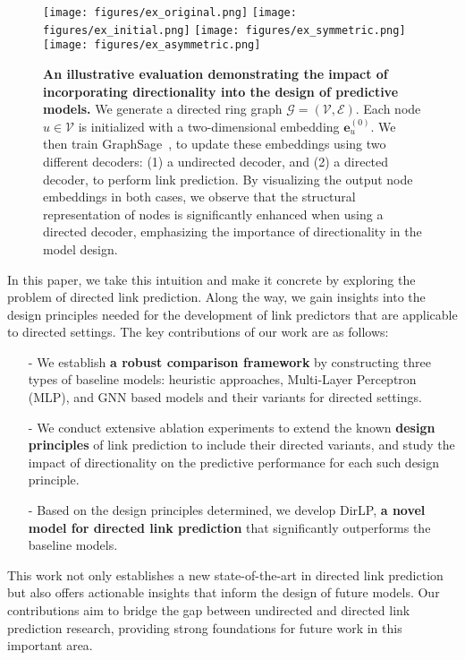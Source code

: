 \documentclass{article}
\begin{document}
\begin{figure}[t]
    \centering
    \texttt{[image: figures/ex\_original.png]} 
    \texttt{[image: figures/ex\_initial.png]}
    \texttt{[image: figures/ex\_symmetric.png]}
    \texttt{[image: figures/ex\_asymmetric.png]}
    \caption{
    \textbf{An illustrative evaluation demonstrating the impact of incorporating directionality into the design of predictive models.} We generate a directed ring graph $\mathcal{G} = (\mathcal{V}, \mathcal{E})$. Each node $u \in \mathcal{V}$ is initialized with a two-dimensional embedding $\mathbf{e}_u^{(0)}$. We then train GraphSage~\citep{hamilton2017inductive}, to update these embeddings using two different decoders: (1) a undirected decoder, and (2) a directed decoder, to perform link prediction. By visualizing the output node embeddings in both cases, we observe that the structural representation of nodes is significantly enhanced when using a directed decoder, emphasizing the importance of directionality in the model design.
    }
    \label{fig:toy_example}
\end{figure}


In this paper, we take this intuition and make it concrete by exploring the problem of directed link prediction. Along the way, we gain insights into the design principles needed for the development of link predictors that are applicable to directed settings. The key contributions of our work are as follows:
\begin{itemize}[leftmargin=*]
    \item[-] We establish \textbf{a robust comparison framework} by constructing three types of baseline models: heuristic approaches, Multi-Layer Perceptron (MLP), and GNN based models and their variants for directed settings. 
    \item[-] We conduct extensive ablation experiments to extend the known \textbf{design principles} of link prediction to include their directed variants, and study the impact of directionality on the predictive performance for each such design principle. 
    \item[-] Based on the design principles determined, we develop DirLP, \textbf{a novel model for directed link prediction} that significantly outperforms the baseline models.  
\end{itemize}

This work not only establishes a new state-of-the-art in directed link prediction but also offers actionable insights that inform the design of future models. Our contributions aim to bridge the gap between undirected and directed link prediction research, providing strong foundations for future work in this important area. 
\end{document}
